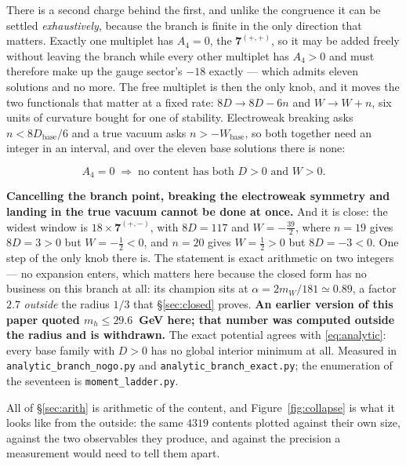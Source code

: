 \documentclass[11pt,a4paper]{article}
\newcommand{\rep}[1]{\mathbf{#1}}
\newenvironment{keyeq}
  {\begin{center}\setlength{\fboxsep}{9pt}\setlength{\fboxrule}{0.8pt}%
   \begin{lrbox}{\keyeqbox}\begin{minipage}{0.88\textwidth}}
  {\end{minipage}\end{lrbox}%
   \fcolorbox{hdrblue!55}{hdrblue!6}{\usebox{\keyeqbox}}\end{center}}
\begin{document}
There is a second charge behind the first, and unlike the congruence it can be settled
\emph{exhaustively}, because the branch is finite in the only direction that matters. Exactly one
multiplet has $A_4=0$, the $\rep7^{(+,+)}$, so it may be added freely without leaving the branch
while every other multiplet has $A_4>0$ and must therefore make up the gauge sector's $-18$ exactly
--- which admits eleven solutions and no more. The free multiplet is then the only knob, and it
moves the two functionals that matter at a fixed rate: $8D\to8D-6n$ and $W\to W+n$, six units of
curvature bought for one of stability. Electroweak breaking asks $n<8D_{\text{base}}/6$ and a true
vacuum asks $n>-W_{\text{base}}$, so both together need an integer in an interval, and over the
eleven base solutions there is none:
\begin{keyeq}
\begin{equation}\label{eq:analytic}
  A_4=0\;\Longrightarrow\;\text{no content has both } D>0 \text{ and } W>0 .
\end{equation}
\end{keyeq}
\noindent \textbf{Cancelling the branch point, breaking the electroweak symmetry and landing in the
true vacuum cannot be done at once.} And it is close: the widest window is $18\times\rep7^{(+,-)}$,
with $8D=117$ and $W=-\tfrac{39}{2}$, where $n=19$ gives $8D=3>0$ but $W=-\tfrac12<0$, and $n=20$
gives $W=\tfrac12>0$ but $8D=-3<0$. One step of the only knob there is. The statement is exact
arithmetic on two integers --- no expansion enters, which matters here because the closed form has
no business on this branch at all: its champion sits at $\alpha=2m_W/181\simeq0.89$, a factor $2.7$
\emph{outside} the radius $1/3$ that \S\ref{sec:closed} proves. \textbf{An earlier version of this
paper quoted $m_h\le29.6$~GeV here; that number was computed outside the radius and is withdrawn.}
The exact potential agrees with \eqref{eq:analytic}: every base family with $D>0$ has no global
interior minimum at all. Measured in \texttt{analytic\_\allowbreak branch\_\allowbreak nogo.py} and
\texttt{analytic\_\allowbreak branch\_\allowbreak exact.py}; the enumeration of the seventeen is
\texttt{moment\_\allowbreak ladder.py}.

All of \S\ref{sec:arith} is arithmetic of the content, and Figure~\ref{fig:collapse} is what it
looks like from the outside: the same $4319$ contents plotted against their own size, against the
two observables they produce, and against the precision a measurement would need to tell them
apart.
\end{document}
